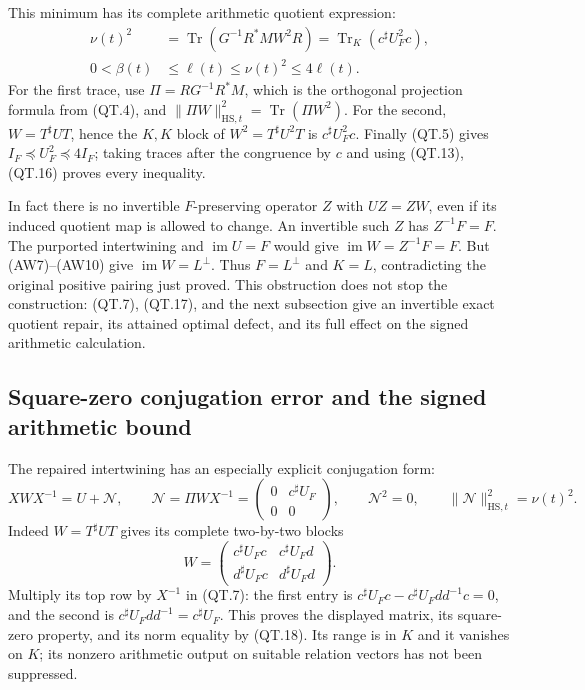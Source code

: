 This minimum has its complete arithmetic quotient expression:
\[
 \begin{split}
 \nu(t)^2
 &=\operatorname{Tr}\!\left(G^{-1}R^*MW^2R\right)
   =\operatorname{Tr}_K(c^\sharp U_F^2c),\\
 0<\beta(t)&\le\ell(t)\le\nu(t)^2\le4\ell(t).
 \end{split}
 \tag{QT.18}\label{eq:qt-minimumenergy}
\]
For the first trace, use \(\Pi=RG^{-1}R^*M\), which is the
orthogonal projection formula from (QT.4), and
\(\|\Pi W\|_{\mathrm{HS},t}^2=\operatorname{Tr}(\Pi W^2)\).
For the second, \(W=T^\sharp UT\), hence
the \(K,K\) block of \(W^2=T^\sharp U^2T\) is \(c^\sharp U_F^2c\).
Finally (QT.5) gives
\(I_F\preceq U_F^2\preceq4I_F\); taking traces after the congruence
by \(c\) and using (QT.13), (QT.16) proves every inequality.

In fact there is no invertible \(F\)-preserving operator \(Z\) with
\(UZ=ZW\), even if its induced quotient map is allowed to change.
An invertible such \(Z\) has \(Z^{-1}F=F\).
The purported intertwining and \(\operatorname{im}U=F\) would give
\(\operatorname{im}W=Z^{-1}F=F\).
But (AW7)--(AW10) give \(\operatorname{im}W=L^\perp\).
Thus \(F=L^\perp\) and \(K=L\), contradicting the original positive
pairing just proved. This obstruction does not stop the construction:
(QT.7), (QT.17), and the next subsection give an invertible exact
quotient repair, its attained optimal defect, and its full effect on
the signed arithmetic calculation.

\subsection{Square-zero conjugation error and the signed arithmetic bound}

The repaired intertwining has an especially explicit conjugation form:
\[
 XWX^{-1}=U+\mathcal N,\qquad
 \mathcal N=\Pi WX^{-1}
   =\begin{pmatrix}0&c^\sharp U_F\\0&0\end{pmatrix},
 \qquad \mathcal N^2=0,\qquad
 \|\mathcal N\|_{\mathrm{HS},t}^2=\nu(t)^2.
 \tag{QT.19}\label{eq:qt-nilpotent}
\]
Indeed \(W=T^\sharp UT\) gives its complete two-by-two blocks
\[
 W=
 \begin{pmatrix}
  c^\sharp U_Fc&c^\sharp U_Fd\\
  d^\sharp U_Fc&d^\sharp U_Fd
 \end{pmatrix}.
 \]
Multiply its top row by \(X^{-1}\) in (QT.7): the first entry is
\(c^\sharp U_Fc-c^\sharp U_Fdd^{-1}c=0\), and the second is
\(c^\sharp U_Fdd^{-1}=c^\sharp U_F\).
This proves the displayed matrix, its square-zero property, and its
norm equality by (QT.18). Its range is in \(K\) and it vanishes on
\(K\); its nonzero arithmetic output on suitable relation vectors
has not been suppressed.

